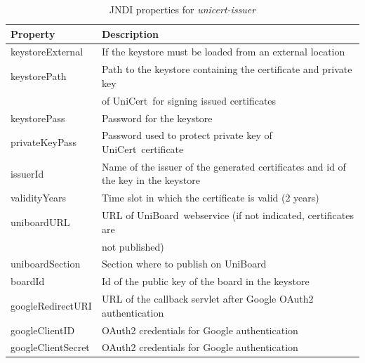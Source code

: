 \documentclass[oneside]{scrreprt}
\newcommand{\uniboard}{\mbox{UniBoard}}
\newcommand{\unicert}{\mbox{UniCert}}
\begin{document}
\begin{table}[ht]

\centering
\begin{tabular}{|l|l|}
  \hline
  Property & Description\\
  \hline
  keystoreExternal & If the keystore must be loaded from an external location\\
  keystorePath & Path to the keystore containing the certificate and private key\\ &  of \unicert\ for signing issued certificates\\
  keystorePass & Password for the keystore \\
  privateKeyPass & Password used to protect private key of \unicert\ certificate \\
  issuerId & Name of the issuer of the generated certificates and id of the key in the keystore \\
  validityYears & Time slot in which the certificate is valid (2 years) \\
  uniboardURL & URL of \uniboard\ webservice (if not indicated, certificates are\\ & not published)\\
  uniboardSection & Section where to publish on \uniboard\\
  boardId & Id of the public key of the board in the keystore \\
  googleRedirectURI & URL of the callback servlet after Google OAuth2 authentication \\
  googleClientID & OAuth2 credentials for Google authentication\\
  googleClientSecret & OAuth2 credentials for Google authentication\\
  \hline
\end{tabular}
\caption{JNDI properties for \textit{unicert-issuer}}
\label{t:jndi1}
\end{table}
\end{document}
